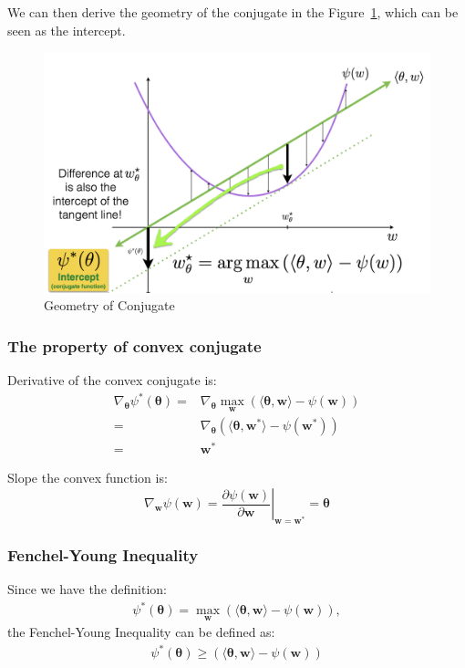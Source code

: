 \documentclass[11pt]{article}
\DeclareMathOperator*{\maximize}{max}
\newcommand{\btheta}{\boldsymbol{\theta}}
\newcommand{\bw}{\boldsymbol{w}}
\begin{document}
We can then derive the geometry of the conjugate in the Figure~\ref{fig:conjugate}, which can be seen as the intercept.

\begin{figure}[H]
\begin{center}
\includegraphics[width=0.7\linewidth]{Img/geometry_conjugate.png}
\end{center}
\vspace{-5mm}
 \caption{Geometry of Conjugate}
\label{fig:conjugate}
\end{figure}

\subsubsection{The property of convex conjugate}
Derivative of the convex conjugate is:
\begin{align}
\nabla_{\btheta} \psi^* (\btheta) = & \nabla_{\btheta} \maximize_{\bw} \left( \langle \btheta, \bw \rangle - \psi (\bw)\right) \nonumber \\
= & \nabla_{\btheta} \left( \langle \btheta, \bw^* \rangle - \psi (\bw^*)\right) \nonumber \\
= & \bw^* \nonumber
\end{align}

Slope the convex function is:
$$\nabla_{\bw} \psi (\bw) = \left. \frac{\partial \psi (\bw)}{\partial \bw} \right|_{\bw=\bw^*} = \btheta$$

\subsubsection{Fenchel-Young Inequality}
Since we have the definition: 
\begin{align}
\psi^* (\btheta) = \maximize_{\bw} \left( \langle \btheta, \bw\rangle - \psi (\bw) \right), \nonumber
\end{align}
the Fenchel-Young Inequality can be defined as:
\begin{align}
\psi^* (\btheta) \geq \left( \langle \btheta, \bw\rangle - \psi (\bw) \right) \nonumber
\end{align}
\end{document}
